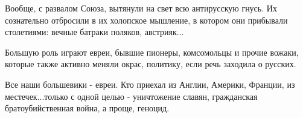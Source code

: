 \begin{itemize}
Вообще, с развалом Союза, вытянули на свет всю антирусскую гнусь. Их
сознательно отбросили в их холопское мышление, в котором они
прибывали столетиями: вечные батраки поляков, австрияк...

Большую роль играют евреи, бывшие пионеры, комсомольцы и прочие вожаки, которые
также активно меняли окрас, политику, если речь заходила о
русских.

Все наши большевики - евреи. Кто приехал из Англии, Америки, Франции, из
местечек...только с одной целью - уничтожение славян,
гражданская братоубийственная война, а проще, геноцид.

\end{itemize}
